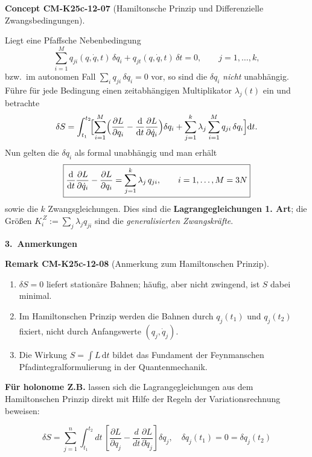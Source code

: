 \documentclass[10pt, letterpaper]{article}
\newcommand{\CustomHeading}[3]{%
  \par\medskip\noindent%
  \textbf{#1 #2} \textnormal{(#3)}.\enskip%
}
\newenvironment{REM}[2]{\begin{unitbox}\CustomHeading{Remark}{#1}{#2}}{\end{unitbox}}
\newenvironment{CONC}[2]{\begin{unitbox}\CustomHeading{Concept}{#1}{#2}}{\end{unitbox}}
\begin{document}
\begin{CONC}{CM-K25c-12-07}{Hamiltonsche Prinzip und Differenzielle Zwangsbedingungen}
Liegt eine Pfaffsche Nebenbedingung
\[
  \sum_{i=1}^{M} q_{ji}(q,\dot q,t)\,\delta q_i
  + q_{jt}(q,\dot q,t)\,\delta t =0,
  \qquad j=1,\dots,k,
\]
bzw.\ im autonomen Fall  
$\sum_{i}q_{ji}\,\delta q_i =0$ vor, so sind die $\delta q_i$
\emph{nicht} unabhängig.  
Führe für jede Bedingung einen zeitabhängigen
Multiplikator $\lambda_j(t)$ ein und betrachte
\[
  \delta S
  =\int_{t_1}^{t_2}\!
     \Bigl[
        \sum_{i=1}^{M}
          \Bigl(
            \frac{\partial L}{\partial q_i}
           -\frac{\mathrm d}{\mathrm dt}
             \frac{\partial L}{\partial\dot q_i}
          \Bigr)\delta q_i
        +\sum_{j=1}^{k}\lambda_j
          \sum_{i=1}^{M}q_{ji}\,\delta q_i
     \Bigr]\mathrm dt .
\]
Nun gelten die $\delta q_i$ als formal unabhängig und man erhält
\[
  \boxed{%
    \frac{\mathrm d}{\mathrm dt}
      \frac{\partial L}{\partial\dot q_i}
    -\frac{\partial L}{\partial q_i}
    =\sum_{j=1}^{k}\lambda_j\,q_{ji},
    \qquad i=1,\dots,M=3N } 
\]
sowie die $k$ Zwangsgleichungen.  
Dies sind die \textbf{Lagrangegleichungen 1. Art};  
die Größen
$\displaystyle
  K_i^{\,Z}:=\sum_{j}\lambda_j q_{ji}
$
sind die \emph{generalisierten Zwangskräfte}.
\end{CONC}

\textbf{3.\ Anmerkungen}

\begin{REM}{CM-K25c-12-08}{Anmerkung zum Hamiltonschen Prinzip}
\begin{enumerate}
  \item $\delta S=0$ liefert stationäre Bahnen; häufig,
        aber nicht zwingend, ist $S$ dabei minimal.
  \item Im Hamiltonschen Prinzip werden die Bahnen durch
        $q_j(t_1)$ und $q_j(t_2)$ fixiert, nicht durch
        Anfangswerte $(q_j,\dot q_j)$.
  \item Die Wirkung
        $S=\int L\,\mathrm dt$
        bildet das Fundament der Feynmanschen Pfadintegralformulierung
        in der Quantenmechanik.
\end{enumerate}
\end{REM}




\textbf{Für holonome Z.B.} lassen sich die Lagrangegleichungen aus dem Hamiltonschen Prinzip direkt mit Hilfe der Regeln der Variationsrechnung beweisen:

\[\delta S = \sum_{j=1}^n \int_{t_1}^{t_2} dt\, \left[\frac{\partial L}{\partial q_j} - \frac{d}{dt}\frac{\partial L}{\partial \dot{q}_j}\right]\delta q_j, \quad \delta q_j(t_1) = 0 = \delta q_j(t_2)\]
\end{document}
